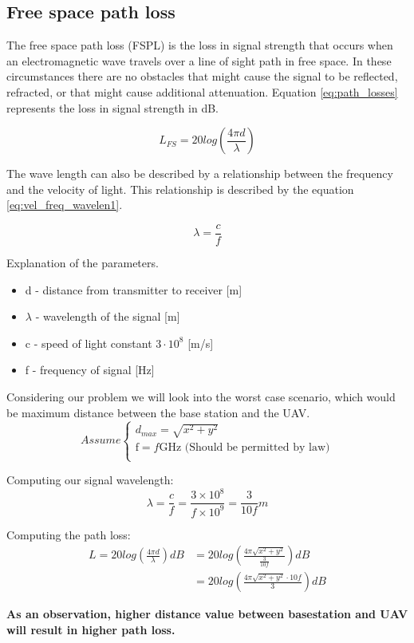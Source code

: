 
\subsection*{Free space path loss}\label{subsection:path_loss}

The free space path loss (FSPL) is the loss in signal strength that occurs when an electromagnetic wave travels over a line of sight path in free space. In these circumstances there are no obstacles that might cause the signal to be reflected, refracted, or that might cause additional attenuation. Equation \ref{eq:path_losses} represents the loss in signal strength in dB.

\begin{equation}\label{eq:path_losses}
L_{FS} = 20log\left (\frac{4\pi d}{\lambda} \right)
\end{equation}

The wave length can also be described by a relationship between the frequency and the velocity of light. This relationship is described by the equation \ref{eq:vel_freq_wavelen1}.

\begin{equation}\label{eq:vel_freq_wavelen1}
\lambda = \frac{c}{f}
\end{equation}


Explanation of the parameters.
\begin{itemize}
\item d - distance from transmitter to receiver [m]
\item $\lambda$ - wavelength of the signal [m]
\item c - speed of light constant $3\cdot 10^8$ [m/s] 
\item f - frequency of signal [Hz]
\end{itemize}

Considering our problem we will look into the worst case scenario, which would be maximum distance between the base station and the UAV. 
\begin{equation*}
Assume \begin{cases}
d_{max} = \sqrt{x^2+y^2}\\
\text{f} = f\text{GHz (Should be permitted by law})\\
\end{cases}
\end{equation*}

Computing our signal wavelength:
\begin{equation}\label{eq:vel_freq_wavelen2}
\lambda = \frac{c}{f} = \frac{3\times 10^{8}}{f\times 10^{9}}=\frac{3}{10f}m
\end{equation}

Computing the path loss:
\begin{align*}\label{eq:path_loses_calc}
L = 20log\left (\frac{4\pi d}{\lambda} \right) dB &= 20log\left (\frac{4\pi \sqrt{x^2+y^2}}{\frac{3}{10f}} \right) dB \\ 
&= 20log\left (\frac{4\pi \sqrt{x^2+y^2}\cdot 10f}{ 3} \right) dB
\end{align*}

\noindent \textbf{As an observation, higher distance value between basestation and UAV will result in higher path loss.}